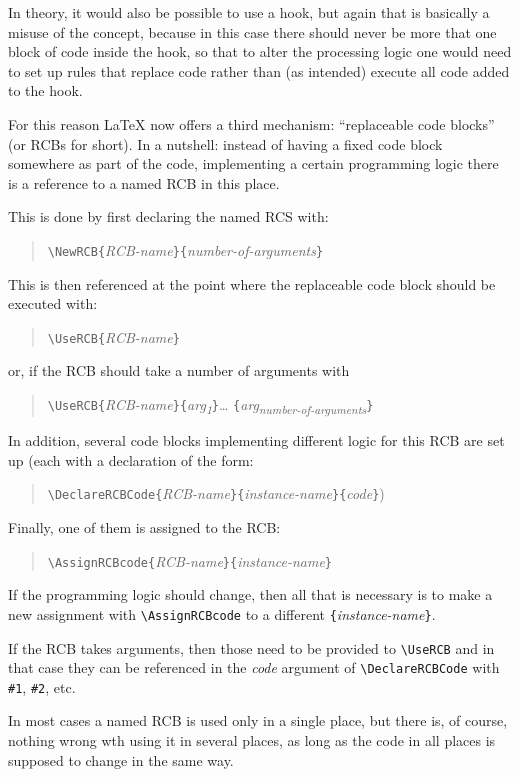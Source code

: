 \documentclass{article}
\newcommand\cs[1]{\texttt{\textbackslash #1}}
\newcommand\meta[1]{\textlangle\textit{#1}\textrangle}
\newcommand\marg[1]{\texttt\{\meta{#1}\texttt\}}
\begin{document}
In theory, it would also be possible to use a hook, but again that is
basically a misuse of the concept, because in this case there should
never be more that one block of code inside the hook, so that to alter
the processing logic one would need to set up rules that replace code
rather than (as intended) execute all code added to the hook.



For this reason \LaTeX{} now offers a third mechanism:
\enquote{replaceable code blocks} (or RCBs for short).
%
In a nutshell: instead of having a fixed code block somewhere as part
of the code, implementing a certain programming logic there is a
reference to a named RCB in this place.

This is done by first declaring the named RCS with:
\begin{quote}
\cs{NewRCB}\marg{RCB-name}\marg{number-of-arguments}
\end{quote}
This is then referenced at the point where the replaceable code block
should be executed with:
\begin{quote}
 \cs{UseRCB}\marg{RCB-name}
\end{quote}
or, if the RCB should take a number of arguments with
\begin{quote}
  \cs{UseRCB}\marg{RCB-name}\marg{arg\textsubscript{1}}\ldots
  \marg{arg\textsubscript{number-of-arguments}}
\end{quote}

In addition, several code blocks implementing different logic for this
RCB are set up (each with a declaration of the form:
\begin{quote}
  \cs{DeclareRCBCode}\marg{RCB-name}\marg{instance-name}\marg{code})
\end{quote}
Finally,
one of them is assigned to the RCB:
\begin{quote}
\cs{AssignRCBcode}\marg{RCB-name}\marg{instance-name}
\end{quote}
If the programming logic should change, then all that is necessary is
to make a new assignment with \cs{AssignRCBcode} to a different
\marg{instance-name}.

If the RCB takes arguments, then those need to be provided to
\cs{UseRCB} and in that case they can be referenced in the \meta{code}
argument of \cs{DeclareRCBCode} with \verb=#1=, \verb=#2=, etc.

In most cases a named RCB is used only in a single place, but there
is, of course, nothing wrong wth using it in several places, as long
as the code in all places is supposed to change in the same way.
\end{document}
